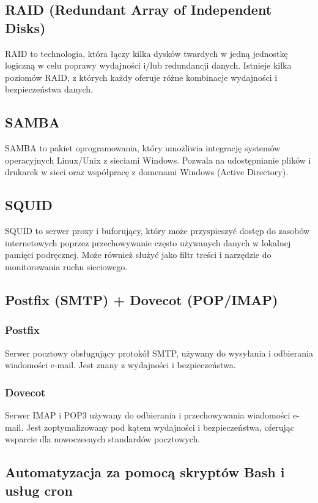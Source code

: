 \documentclass[a4paper]{article}
\begin{document}
\subsection{RAID (Redundant Array of Independent Disks)}
RAID to technologia, która łączy kilka dysków twardych w jedną jednostkę logiczną w celu poprawy wydajności i/lub redundancji danych. Istnieje kilka poziomów RAID, z których każdy oferuje różne kombinacje wydajności i bezpieczeństwa danych.

\subsection{SAMBA}
SAMBA to pakiet oprogramowania, który umożliwia integrację systemów operacyjnych Linux/Unix z sieciami Windows. Pozwala na udostępnianie plików i drukarek w sieci oraz współpracę z domenami Windows (Active Directory).

\subsection{SQUID}
SQUID to serwer proxy i buforujący, który może przyspieszyć dostęp do zasobów internetowych poprzez przechowywanie często używanych danych w lokalnej pamięci podręcznej. Może również służyć jako filtr treści i narzędzie do monitorowania ruchu sieciowego.

\subsection{Postfix (SMTP) + Dovecot (POP/IMAP)}
\subsubsection{Postfix}
Serwer pocztowy obsługujący protokół SMTP, używany do wysyłania i odbierania wiadomości e-mail. Jest znany z wydajności i bezpieczeństwa.

\subsubsection{Dovecot}
Serwer IMAP i POP3 używany do odbierania i przechowywania wiadomości e-mail. Jest zoptymalizowany pod kątem wydajności i bezpieczeństwa, oferując wsparcie dla nowoczesnych standardów pocztowych.

\subsection{Automatyzacja za pomocą skryptów Bash i usług cron}
\end{document}
